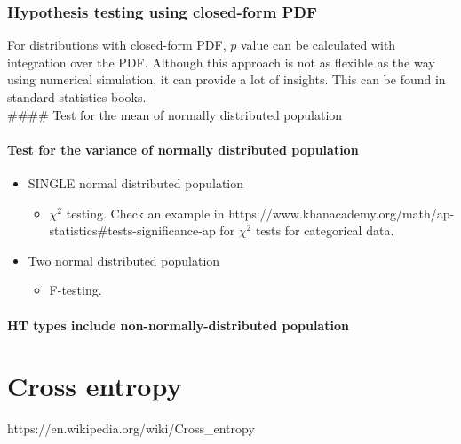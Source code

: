 \documentclass[11pt]{article}
\providecommand{\tightlist}{%
      \setlength{\itemsep}{0pt}\setlength{\parskip}{0pt}}
\begin{document}
    \subsubsection{Hypothesis testing using closed-form
PDF}\label{hypothesis-testing-using-closed-form-pdf}

For distributions with closed-form PDF, \(p\) value can be calculated
with integration over the PDF. Although this approach is not as flexible
as the way using numerical simulation, it can provide a lot of insights.
This can be found in standard statistics books.\\
\#\#\#\# Test for the mean of normally distributed population

\paragraph{Test for the variance of normally distributed
population}\label{test-for-the-variance-of-normally-distributed-population}

\begin{itemize}
\tightlist
\item
  SINGLE normal distributed population

  \begin{itemize}
  \tightlist
  \item
    \(\chi^2\) testing. Check an example in
    https://www.khanacademy.org/math/ap-statistics\#tests-significance-ap
    for \(\chi^2\) tests for categorical data.
  \end{itemize}
\item
  Two normal distributed population

  \begin{itemize}
  \tightlist
  \item
    F-testing.
  \end{itemize}
\end{itemize}

\paragraph{HT types include non-normally-distributed
population}\label{ht-types-include-non-normally-distributed-population}

    \section{Cross entropy}\label{cross-entropy}

https://en.wikipedia.org/wiki/Cross\_entropy
\end{document}
